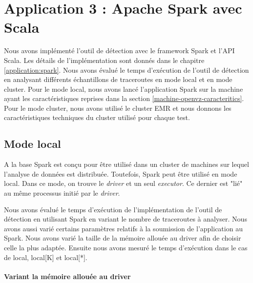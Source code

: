 \section{Application 3 : Apache Spark  avec Scala}
Nous avons implémenté l'outil de détection avec le framework Spark et l'API Scala. Les détails de l'implémentation sont donnés dans le chapitre \ref{application:spark}.  Nous avons évalué le temps d'exécution de l'outil de détection en analysant différents échantillons de traceroutes  en mode local et en mode cluster. Pour le mode local, nous avons lancé l'application Spark sur la machine ayant les caractéristiques  reprises dans la section \ref{machine-openvz-caracteritics}. Pour le mode cluster, nous avons utilisé le cluster EMR et nous donnons les caractéristiques techniques du cluster utilisé pour chaque test.


\subsection{Mode local}

A la base Spark est conçu pour être utilisé dans un cluster de machines sur  lequel l'analyse de données est distribuée. Toutefois, Spark peut être utilisé en mode local. Dans ce mode, on trouve le \textit{driver} et un seul \textit{executor}. Ce dernier est "lié" au même processus initié par le \textit{driver}. 


Nous avons évalué le temps d'exécution de l'implémentation de l'outil de détection en utilisant Spark en variant le nombre de traceroutes à analyser. Nous avons aussi varié certains paramètres relatifs à la soumission de l'application au Spark. Nous avons varié la taille de la mémoire allouée au driver afin de choisir celle la plus adaptée. Ensuite nous avons mesuré le temps d'exécution dans le cas de local, local[K] et local[*].

\begin{figure}[H]
	\centering
	\captionsetup{justification=centering}
	\resizebox{\textwidth}{!}{
		
	}
	\caption{ }
	\label{fig:sparktimingLocal}
\end{figure}


\paragraph{Variant la mémoire allouée au driver}~

